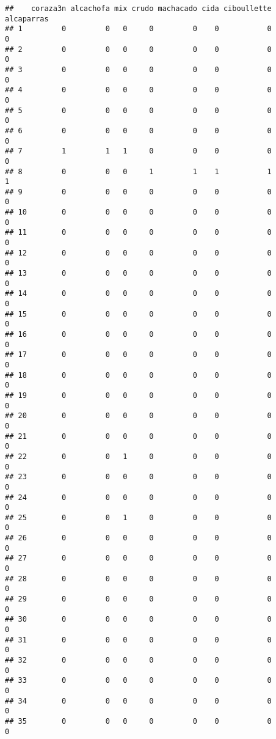 \documentclass[
]{article}
\begin{document}
\begin{verbatim}
##    coraza3n alcachofa mix crudo machacado cida ciboullette alcaparras
## 1         0         0   0     0         0    0           0          0
## 2         0         0   0     0         0    0           0          0
## 3         0         0   0     0         0    0           0          0
## 4         0         0   0     0         0    0           0          0
## 5         0         0   0     0         0    0           0          0
## 6         0         0   0     0         0    0           0          0
## 7         1         1   1     0         0    0           0          0
## 8         0         0   0     1         1    1           1          1
## 9         0         0   0     0         0    0           0          0
## 10        0         0   0     0         0    0           0          0
## 11        0         0   0     0         0    0           0          0
## 12        0         0   0     0         0    0           0          0
## 13        0         0   0     0         0    0           0          0
## 14        0         0   0     0         0    0           0          0
## 15        0         0   0     0         0    0           0          0
## 16        0         0   0     0         0    0           0          0
## 17        0         0   0     0         0    0           0          0
## 18        0         0   0     0         0    0           0          0
## 19        0         0   0     0         0    0           0          0
## 20        0         0   0     0         0    0           0          0
## 21        0         0   0     0         0    0           0          0
## 22        0         0   1     0         0    0           0          0
## 23        0         0   0     0         0    0           0          0
## 24        0         0   0     0         0    0           0          0
## 25        0         0   1     0         0    0           0          0
## 26        0         0   0     0         0    0           0          0
## 27        0         0   0     0         0    0           0          0
## 28        0         0   0     0         0    0           0          0
## 29        0         0   0     0         0    0           0          0
## 30        0         0   0     0         0    0           0          0
## 31        0         0   0     0         0    0           0          0
## 32        0         0   0     0         0    0           0          0
## 33        0         0   0     0         0    0           0          0
## 34        0         0   0     0         0    0           0          0
## 35        0         0   0     0         0    0           0          0

\end{verbatim}
\end{document}
